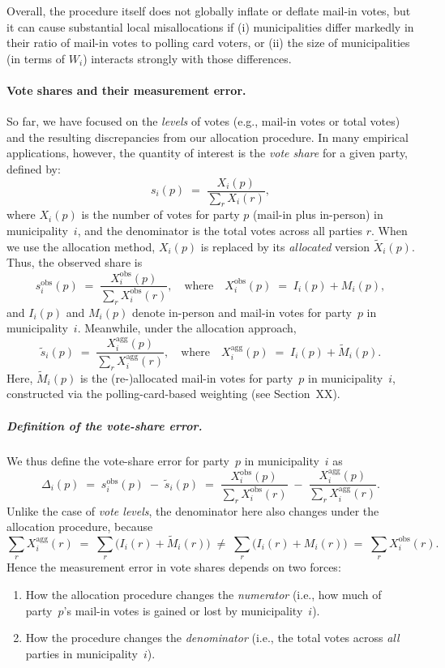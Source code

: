 \documentclass[12pt]{article}
\begin{document}
Overall, the procedure itself does not globally inflate or deflate mail-in votes, but it can cause substantial local misallocations if (i) municipalities differ markedly in their ratio of mail-in votes to polling card voters, or (ii) the size of municipalities (in terms of \(W_i\)) interacts strongly with those differences.

\paragraph{Vote shares and their measurement error.}
So far, we have focused on the \emph{levels} of votes (e.g., mail-in votes or total votes) and the resulting discrepancies from our allocation procedure. In many empirical applications, however, the quantity of interest is the \emph{vote share} for a given party, defined by:
\[
    s_i(p)
    \;=\;
    \frac{X_i(p)}{\sum_{r} X_i(r)},
\]
where \(X_i(p)\) is the number of votes for party \(p\) (mail-in plus in-person) in municipality~\(i\), and the denominator is the total votes across all parties \(r\). When we use the allocation method, \(X_i(p)\) is replaced by its \emph{allocated} version \(\widetilde{X}_i(p)\). Thus, the observed share is
\[
    s_i^{\text{obs}}(p)
    \;=\;
    \frac{X_i^{\text{obs}}(p)}{\sum_{r} X_i^{\text{obs}}(r)},
    \quad
    \text{where}
    \quad
    X_i^{\text{obs}}(p)
    \;=\;
    I_i(p) + M_i(p),
\]
and \(I_i(p)\) and \(M_i(p)\) denote in-person and mail-in votes for party~\(p\) in municipality~\(i\). Meanwhile, under the allocation approach,
\[
    \widetilde{s}_i(p)
    \;=\;
    \frac{X_i^{\text{agg}}(p)}{\sum_{r} X_i^{\text{agg}}(r)},
    \quad
    \text{where}
    \quad
    X_i^{\text{agg}}(p)
    \;=\;
    I_i(p) + \widetilde{M}_i(p).
\]
Here, \(\widetilde{M}_i(p)\) is the (re-)allocated mail-in votes for party~\(p\) in municipality~\(i\), constructed via the polling-card-based weighting (see Section~XX).

\subparagraph{Definition of the vote-share error.}
We thus define the vote-share error for party~\(p\) in municipality~\(i\) as
\[
    \Delta_i(p)
    \;=\;
    s_i^{\text{obs}}(p)
    \;-\;
    \widetilde{s}_i(p)
    \;=\;
    \frac{X_i^{\text{obs}}(p)}{\sum_{r} X_i^{\text{obs}}(r)}
    \;-\;
    \frac{X_i^{\text{agg}}(p)}{\sum_{r} X_i^{\text{agg}}(r)}.
\]
Unlike the case of \emph{vote levels}, the denominator here also changes under the allocation procedure, because
\[
    \sum_{r} X_i^{\text{agg}}(r)
    \;=\;
    \sum_{r}
    \bigl(I_i(r) + \widetilde{M}_i(r)\bigr)
    \;\neq\;
    \sum_{r}
    \bigl(I_i(r) + M_i(r)\bigr)
    \;=\;
    \sum_{r} X_i^{\text{obs}}(r).
\]
Hence the measurement error in vote shares depends on two forces:
\begin{enumerate}
    \item How the allocation procedure changes the \emph{numerator} (i.e., how much of party~\(p\)’s mail-in votes is gained or lost by municipality~\(i\)).
    \item How the procedure changes the \emph{denominator} (i.e., the total votes across \emph{all} parties in municipality~\(i\)).
\end{enumerate}
\end{document}
